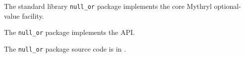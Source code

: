 
The standard library {\tt null\_or} package implements the core Mythryl optional-value facility.

The {\tt null\_or} package implements the  API.

The {\tt null\_or} package source code is in .

